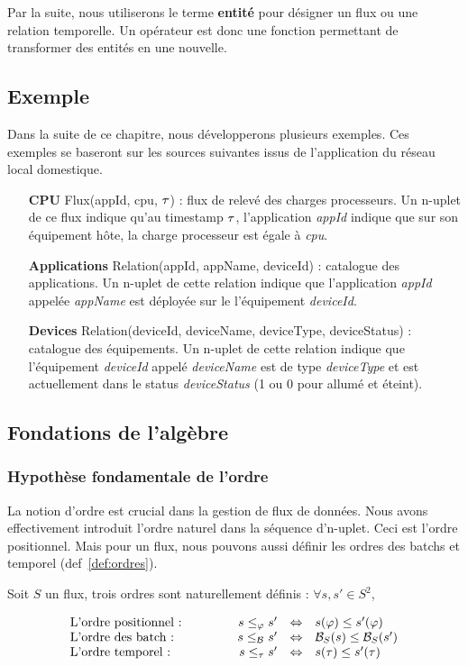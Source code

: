 Par la suite, nous utiliserons le terme \textbf{entité} pour désigner un flux ou une relation temporelle. Un opérateur est donc une fonction permettant de transformer des entités en une nouvelle.
\subsection{Exemple}
Dans la suite de ce chapitre, nous développerons plusieurs exemples. Ces exemples se baseront sur les sources suivantes issus de l'application du réseau local domestique.
\begin{itemize}
    \item[\textbf{CPU}] Flux(appId, cpu, $\tau$) : flux de relevé des charges processeurs. Un n-uplet de ce flux indique qu'au timestamp $\tau$, l'application \textit{appId} indique que sur son équipement hôte, la charge processeur est égale à \textit{cpu}.
    \item[\textbf{Applications}] Relation(appId, appName, deviceId) : catalogue des applications. Un n-uplet de cette relation indique que l'application \textit{appId} appelée \textit{appName} est déployée sur le l'équipement \textit{deviceId}.
    \item[\textbf{Devices}] Relation(deviceId, deviceName, deviceType, deviceStatus) : catalogue des équipements. Un n-uplet de cette relation indique que l'équipement \textit{deviceId} appelé \textit{deviceName} est de type \textit{deviceType} et est actuellement dans le status \textit{deviceStatus} (1 ou 0 pour allumé et éteint).
\end{itemize}

\subsection{Fondations de l'algèbre}
\subsubsection{Hypothèse fondamentale de l'ordre}
La notion d'ordre est crucial dans la gestion de flux de données. Nous avons effectivement introduit l'ordre naturel dans la séquence d'n-uplet. Ceci est l'ordre positionnel. Mais pour un flux, nous pouvons aussi définir les ordres des batchs et temporel (def~\ref{def:ordres}).
\begin{defi}\label{def:ordres}
Soit $S$ un flux, trois ordres sont naturellement définis : $\forall s,s' \in S^2$,

$$\begin{array}{lcrcl} 
\textrm{L'ordre positionnel : } &\qquad & s \leq_\varphi s' & \Leftrightarrow & s(\varphi) \leq s'(\varphi)\\
\textrm{L'ordre des batch : } & & s \leq_{\mathcal{B}_{}} s' &\Leftrightarrow& \mathcal{B}_S(s) \leq \mathcal{B}_S(s')\\
\textrm{L'ordre temporel : } & & s \leq_\tau s' &\Leftrightarrow& s(\tau) \leq s'(\tau)\\
\end{array}$$
\end{defi}

